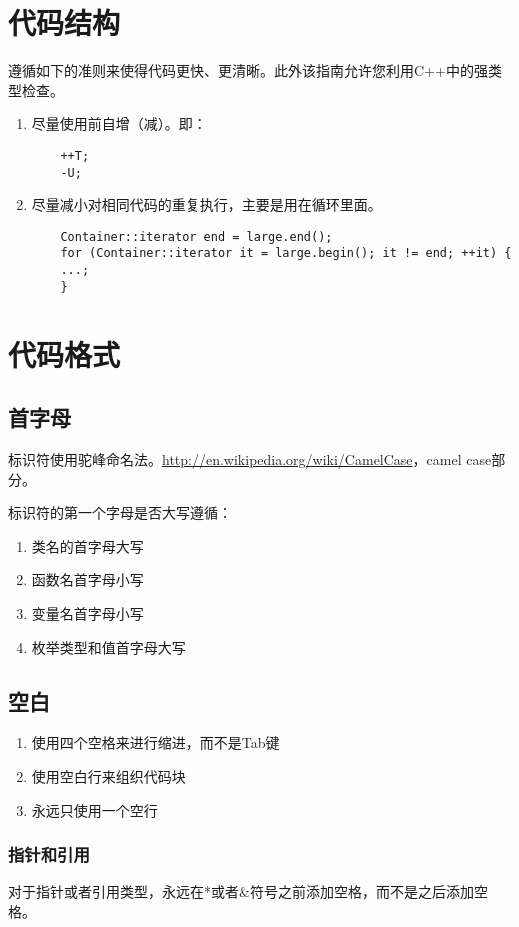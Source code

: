 \section{代码结构}
遵循如下的准则来使得代码更快、更清晰。此外该指南允许您利用C++中的强类型检查。

\begin{enumerate}
	\item 尽量使用前自增（减）。即：
	\begin{lstlisting}
	++T;
	-U;
	\end{lstlisting}
	\item 尽量减小对相同代码的重复执行，主要是用在循环里面。
	\begin{lstlisting}
    Container::iterator end = large.end();
	for (Container::iterator it = large.begin(); it != end; ++it) {
	...;
	}
	\end{lstlisting}
\end{enumerate}

\section{代码格式}
\subsection{首字母}
标识符使用驼峰命名法。\url{http://en.wikipedia.org/wiki/CamelCase}，camel case部分。

标识符的第一个字母是否大写遵循：
\begin{enumerate}
	\item 类名的首字母大写
	\item 函数名首字母小写
	\item 变量名首字母小写
	\item 枚举类型和值首字母大写 
\end{enumerate}

\subsection{空白}
\begin{enumerate}
	\item 使用四个空格来进行缩进，而不是Tab键
	\item 使用空白行来组织代码块
	\item 永远只使用一个空行
\end{enumerate}

\subsubsection{指针和引用}
对于指针或者引用类型，永远在*或者\&符号之前添加空格，而不是之后添加空格。

